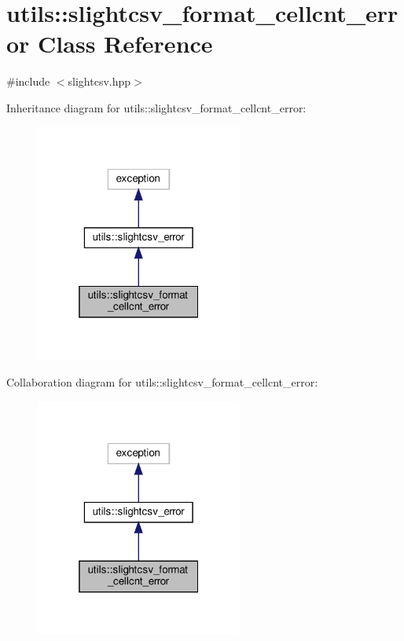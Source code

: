 \hypertarget{classutils_1_1slightcsv__format__cellcnt__error}{}\section{utils\+:\+:slightcsv\+\_\+format\+\_\+cellcnt\+\_\+error Class Reference}
\label{classutils_1_1slightcsv__format__cellcnt__error}


{\ttfamily \#include $<$slightcsv.\+hpp$>$}



Inheritance diagram for utils\+:\+:slightcsv\+\_\+format\+\_\+cellcnt\+\_\+error\+:\nopagebreak
\begin{figure}[H]
\begin{center}
\leavevmode
\includegraphics[width=193pt]{classutils_1_1slightcsv__format__cellcnt__error__inherit__graph}
\end{center}
\end{figure}


Collaboration diagram for utils\+:\+:slightcsv\+\_\+format\+\_\+cellcnt\+\_\+error\+:\nopagebreak
\begin{figure}[H]
\begin{center}
\leavevmode
\includegraphics[width=193pt]{classutils_1_1slightcsv__format__cellcnt__error__coll__graph}
\end{center}
\end{figure}


